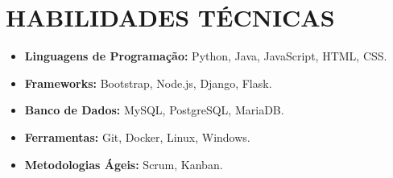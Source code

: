 \section{HABILIDADES TÉCNICAS}
\begin{itemize}
    \item \textbf{Linguagens de Programação:} Python, Java, JavaScript, HTML, CSS.
    \item \textbf{Frameworks:} Bootstrap, Node.js, Django, Flask.
    \item \textbf{Banco de Dados:} MySQL, PostgreSQL, MariaDB.
    \item \textbf{Ferramentas:} Git, Docker, Linux, Windows.
    \item \textbf{Metodologias Ágeis:} Scrum, Kanban.
\end{itemize}
